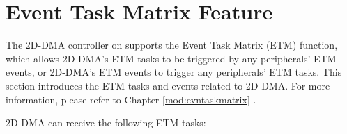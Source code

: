 \documentclass[main\_\_EN.tex]{subfiles}
\begin{document}

\section{Event Task Matrix Feature}
\label{sec:etm-func}

The 2D-DMA controller on \chipname{} supports the Event Task Matrix (ETM) function, which allows 2D-DMA's ETM tasks to be triggered by any peripherals' ETM events, or 2D-DMA's ETM events to trigger any peripherals' ETM tasks. This section introduces the ETM tasks and events related to 2D-DMA. For more information, please refer to Chapter \ref{mod:evntaskmatrix} .

2D-DMA can receive the following ETM tasks:
\end{document}
